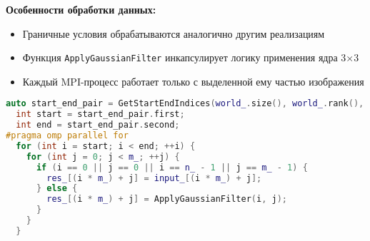 \documentclass[a4paper,12pt]{article}
\begin{document}
\noindent\textbf{Особенности обработки данных:}

\begin{itemize}
\item Граничные условия обрабатываются аналогично другим реализациям
\item Функция \texttt{ApplyGaussianFilter} инкапсулирует логику применения ядра 3×3
\item Каждый MPI-процесс работает только с выделенной ему частью изображения
\end{itemize}

\begin{lstlisting}[language=C++, caption=Основные моменты реализации с MPI+STL]
  auto start_end_pair = GetStartEndIndices(world_.size(), world_.rank(), n_);
  int start = start_end_pair.first;
  int end = start_end_pair.second;
#pragma omp parallel for
  for (int i = start; i < end; ++i) {
    for (int j = 0; j < m_; ++j) {
      if (i == 0 || j == 0 || i == n_ - 1 || j == m_ - 1) {
        res_[(i * m_) + j] = input_[(i * m_) + j];
      } else {
        res_[(i * m_) + j] = ApplyGaussianFilter(i, j);
      }
    }
  }
\end{lstlisting}
\newpage
\end{document}
